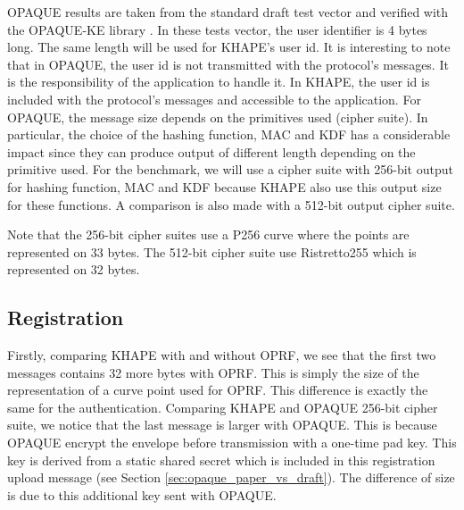 ﻿\documentclass[../report.tex]{subfiles}
\begin{document}
OPAQUE results are taken from the standard draft test vector and verified with the OPAQUE-KE library \cite{OPAQUE-KE}. In these tests vector, the user identifier is 4 bytes long. The same length will be used for KHAPE's user id. It is interesting to note that in OPAQUE, the user id is not transmitted with the protocol's messages. It is the responsibility of the application to handle it. In KHAPE, the user id is included with the protocol's messages and accessible to the application.
For OPAQUE, the message size depends on the primitives used (cipher suite). In particular, the choice of the hashing function, MAC and KDF has a considerable impact since they can produce output of different length depending on the primitive used.
For the benchmark, we will use a cipher suite with 256-bit output for hashing function, MAC and KDF because KHAPE also use this output size for these functions. A comparison is also made with a 512-bit output cipher suite.

Note that the 256-bit cipher suites use a P256 curve where the points are represented on 33 bytes. The 512-bit cipher suite use Ristretto255 which is represented on 32 bytes.

% 
% 

\pgfplotsset{width=\textwidth-2.4cm}

\subsection*{Registration}
Firstly, comparing KHAPE with and without OPRF, we see that the first two messages contains 32 more bytes with OPRF. This is simply the size of the representation of a curve point used for OPRF. This difference is exactly the same for the authentication.
Comparing KHAPE and OPAQUE 256-bit cipher suite, we notice that the last message is larger with OPAQUE.
This is because OPAQUE encrypt the envelope before transmission with a one-time pad key.
This key is derived from a static shared secret which is included in this registration upload message (see Section \ref{sec:opaque_paper_vs_draft}). The difference of size is due to this additional key sent with OPAQUE.
\end{document}
